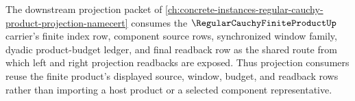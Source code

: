 The downstream projection packet of \autoref{ch:concrete-instances-regular-cauchy-product-projection-namecert} consumes the $\RegularCauchyFiniteProductUp$ carrier's finite index row, component source rows, synchronized window family, dyadic product-budget ledger, and final readback row as the shared route from which left and right projection readbacks are exposed. Thus projection consumers reuse the finite product's displayed source, window, budget, and readback rows rather than importing a host product or a selected component representative.
